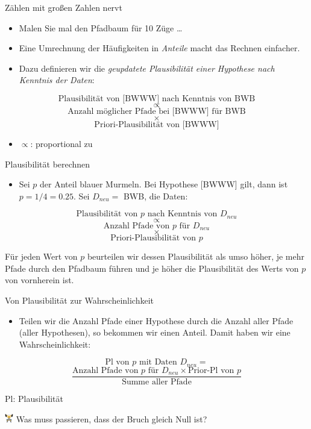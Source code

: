 \documentclass[
  ngerman,
  ignorenonframetext,
]{beamer}
\providecommand{\tightlist}{%
  \setlength{\itemsep}{0pt}\setlength{\parskip}{0pt}}
\begin{document}
\begin{frame}{Zählen mit großen Zahlen nervt}
\protect\hypertarget{zuxe4hlen-mit-grouxdfen-zahlen-nervt}{}
\begin{itemize}
\item
  Malen Sie mal den Pfadbaum für 10 Züge \ldots{}
\item
  Eine Umrechnung der Häufigkeiten in \emph{Anteile} macht das Rechnen
  einfacher.
\item
  Dazu definieren wir die \emph{geupdatete Plausibilität einer Hypothese
  nach Kenntnis der Daten}:
\end{itemize}

\[\text{Plausibilität von [BWWW] nach Kenntnis von BWB}\] \[\propto\]
\[\text{Anzahl möglicher Pfade bei [BWWW] für BWB}\] \[\times\]
\[\text{Priori-Plausibilität von [BWWW]}\]

\begin{itemize}
\tightlist
\item
  \(\propto\): proportional zu
\end{itemize}
\end{frame}

\begin{frame}{Plausibilität berechnen}
\protect\hypertarget{plausibilituxe4t-berechnen}{}
\begin{itemize}
\tightlist
\item
  Sei \(p\) der Anteil blauer Murmeln. Bei Hypothese {[}BWWW{]} gilt,
  dann ist \(p=1/4 = 0.25\). Sei \(D_{neu} =\) BWB, die Daten:
\end{itemize}

\[\text{Plausibilität von }p\text{ nach Kenntnis von }D_{neu}\]
\[\propto\] \[\text{Anzahl Pfade von }p\text{ für }D_{neu}\] \[\times\]
\[\text{Priori-Plausibilität von }p\]

Für jeden Wert von \(p\) beurteilen wir dessen Plausibilität als umso
höher, je mehr Pfade durch den Pfadbaum führen und je höher die
Plausibilität des Werts von \(p\) von vornherein ist.
\end{frame}

\begin{frame}{Von Plausibilität zur Wahrscheinlichkeit}
\protect\hypertarget{von-plausibilituxe4t-zur-wahrscheinlichkeit}{}
\begin{itemize}
\tightlist
\item
  Teilen wir die Anzahl Pfade einer Hypothese durch die Anzahl aller
  Pfade (aller Hypothesen), so bekommen wir einen Anteil. Damit haben
  wir eine Wahrscheinlichkeit:
\end{itemize}

\[\text{Pl von }p\text{ mit Daten }D_{neu} =\]
\[\frac{\text{Anzahl Pfade von }p\text{ für }D_{neu}\times \text{Prior-Pl von }p}{\text{Summe aller Pfade}}\]

Pl: Plausibilität

\includegraphics[width=1em]{../img/weight.pdf} Was muss passieren, dass
der Bruch gleich Null ist?
\end{frame}
\end{document}
